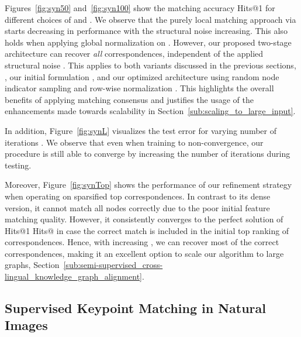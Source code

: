\documentclass{article}
\begin{document}
Figures~\ref{fig:syn50} and~\ref{fig:syn100} show the matching accuracy Hits@1 for different choices of  and .
We observe that the purely local matching approach via  starts decreasing in performance with the structural noise  increasing.
This also holds when applying global  normalization on .
However, our proposed two-stage architecture can recover \emph{all} correspondences, independent of the applied structural noise .
This applies to both variants discussed in the previous sections, \ie, our initial formulation , and our optimized architecture using random node indicator sampling and row-wise normalization .
This highlights the overall benefits of applying matching consensus and justifies the usage of the enhancements made towards scalability in Section~\ref{sub:scaling_to_large_input}.

In addition, Figure~\ref{fig:synL} visualizes the test error  for varying number of iterations .
We observe that even when training to non-convergence, our procedure is still able to converge by increasing the number of iterations  during testing.

Moreover, Figure~\ref{fig:synTop} shows the performance of our refinement strategy when operating on sparsified top  correspondences.
In contrast to its dense version, it cannot match all nodes correctly due to the poor initial feature matching quality.
However, it consistently converges to the perfect solution of Hits@1  Hits@ in case the correct match is included in the initial top  ranking of correspondences.
Hence, with increasing , we can recover most of the correct correspondences, making it an excellent option to scale our algorithm to large graphs, \cf{} Section~\ref{sub:semi-supervised_cross-lingual_knowledge_graph_alignment}.

\subsection{Supervised Keypoint Matching in Natural Images}\label{sub:supervised_keypoint_matching_in_natural_images}
\end{document}
